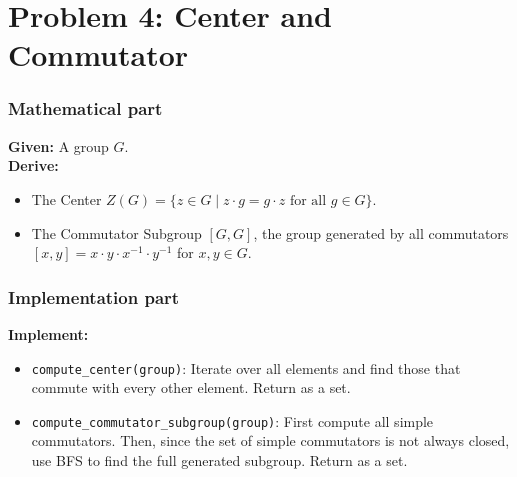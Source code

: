 \documentclass[11pt]{article}
\begin{document}
\section*{Problem 4: Center and Commutator}

\subsubsection*{Mathematical part}
\textbf{Given:} A group $G$. \\
\textbf{Derive:} 
\begin{itemize}
    \item The Center $Z(G) = \{ z \in G \mid z \cdot g = g \cdot z \text{ for all } g \in G\}$.
    \item The Commutator Subgroup $[G, G]$, the group generated by all commutators $[x, y] = x \cdot y \cdot x^{-1} \cdot y^{-1}$ for $x,y \in G$.
\end{itemize}

\subsubsection*{Implementation part}
\textbf{Implement:}
\begin{itemize}
    \item \lstinline|compute_center(group)|: Iterate over all elements and find those that commute with every other element. Return as a set.
    \item \lstinline|compute_commutator_subgroup(group)|: First compute all simple commutators. Then, since the set of simple commutators is not always closed, use BFS to find the full generated subgroup. Return as a set.
\end{itemize}
\end{document}
